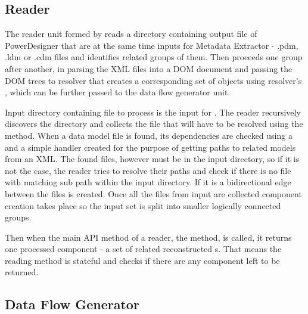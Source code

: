 \subsection{Reader}

The reader unit formed by  reads a directory containing output file of PowerDesigner that are at the same time inputs for Metadata Extractor - .pdm, .ldm or .cdm files and identifies related groups of them. Then proceeds one group after another, in parsing the XML files into a DOM document and passing the DOM trees to resolver that creates a corresponding set of  objects using resolver's , which can be further passed to the data flow generator unit.
 
Input directory containing file to process is the input for . The reader recursively discovers the directory and collects the file that will have to be resolved using the  method. When a data model file is found, its dependencies are checked using a  and a simple handler  created for the purpose of getting paths to related models from an XML. The found files, however must be in the input directory, so if it is not the case, the reader tries to resolve their paths and check if there is no file with matching sub path within the input directory. If it is a bidirectional edge between the files is created. 
Once all the files from input are collected component creation takes place so the input set is split into smaller logically connected groups.

Then when the main API method of a reader, the  method, is called, it returns one processed component - a set of related reconstructed s. 
That means the reading method is stateful and  checks if there are any component left to be returned.

\subsection{Data Flow Generator}

